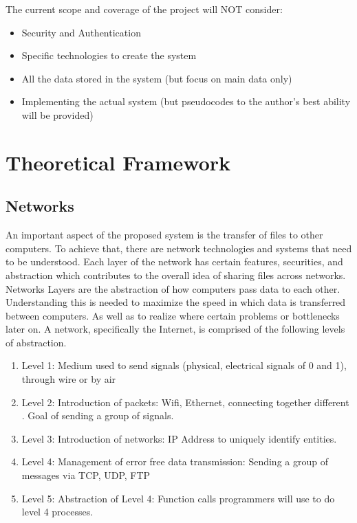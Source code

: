 \documentclass[acmsmall]{acmart}
\begin{document}
The current scope and coverage of the project will NOT consider:

\begin{itemize}
    \item Security and Authentication 
    \item Specific technologies to create the system
    \item All the data stored in the system (but focus on main data only)
    \item Implementing the actual system (but pseudocodes to the author's best ability will be provided)
\end{itemize}




\section{Theoretical Framework}

\subsection{Networks}

An important aspect of the proposed system is the transfer of files to other computers. To achieve that, there are network technologies and systems that need to be understood. Each layer of the network has certain features, securities, and abstraction which contributes to the overall idea of sharing files across networks. Networks Layers are the abstraction of how computers pass data to each other. Understanding this is needed to maximize the speed in which data is transferred between computers. As well as to realize where certain problems or bottlenecks later on. A network, specifically the Internet, is comprised of the following levels of abstraction. \cite{kurose}
\begin{enumerate}
    \item Level 1: Medium used to send signals (physical, electrical signals of 0
and 1), through wire or by air
    \item Level 2: Introduction of packets: Wifi, Ethernet, connecting together
different . Goal of sending a group of signals.
    \item Level 3: Introduction of networks: IP Address to uniquely identify
entities.
    \item Level 4: Management of error free data transmission: Sending a group
of messages via TCP, UDP, FTP
    \item Level 5: Abstraction of Level 4: Function calls programmers will use
to do level 4 processes.
\end{enumerate}
\end{document}
